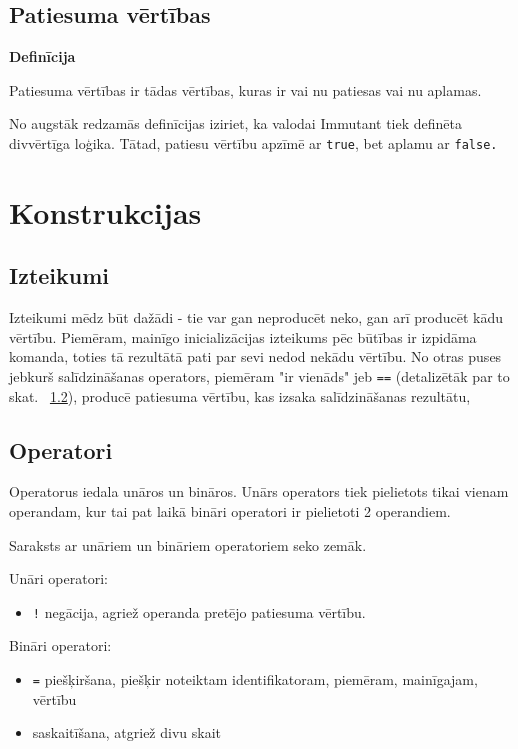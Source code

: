 \documentclass[12pt,a4paper]{report}
\begin{document}
\subsection{Patiesuma vērtības}

\textbf{Definīcija}

Patiesuma vērtības ir tādas vērtības, kuras ir vai nu patiesas vai nu aplamas.

No augstāk redzamās definīcijas iziriet, ka valodai Immutant tiek definēta divvērtīga loģika. Tātad, patiesu vērtību apzīmē ar \texttt{true}, bet aplamu ar \texttt{false.}

\section{Konstrukcijas}

\subsection{Izteikumi}

Izteikumi mēdz būt dažādi - tie var gan neproducēt neko, gan arī producēt kādu vērtību. Piemēram, mainīgo inicializācijas izteikums pēc būtības ir izpidāma komanda, toties tā rezultātā pati par sevi nedod nekādu vērtību. No otras puses jebkurš salīdzināšanas operators, piemēram "ir vienāds" jeb \texttt{==} (detalizētāk par to skat. ~\ref{section:operators}), producē patiesuma vērtību, kas izsaka salīdzināšanas rezultātu,

\subsection{Operatori}
\label{section:operators}

Operatorus iedala unāros un bināros. Unārs operators tiek pielietots tikai vienam operandam, kur tai pat laikā bināri operatori ir pielietoti 2 operandiem.

Saraksts ar unāriem un bināriem operatoriem seko zemāk.

Unāri operatori:


\begin{itemize}
  \item \texttt{!} negācija, agriež operanda pretējo patiesuma vērtību.
\end{itemize}

Bināri operatori:

\begin{itemize}
  \item \texttt{=} piešķiršana, piešķir noteiktam identifikatoram, piemēram, mainīgajam, vērtību
  \item \text{+} saskaitīšana, atgriež divu skait
\end{itemize} 
\end{document}
